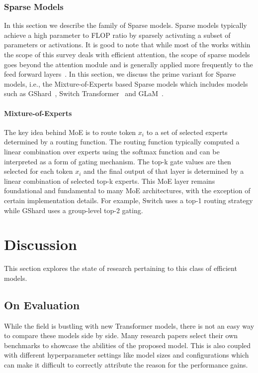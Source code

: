 \subsubsection{Sparse Models} In this section we describe the family of Sparse models. Sparse models typically achieve a high parameter to FLOP ratio by sparsely activating a subset of parameters or activations. It is good to note that while most of the works within the scope of this survey deals with efficient attention, the scope of sparse models goes beyond the attention module and is generally applied more frequently to the feed forward layers~\citep{lepikhin2020gshard,fedus2021switch}. In this section, we discuss the prime variant for Sparse models, i.e., the Mixture-of-Experts based Sparse models which includes models such as GShard~\citep{lepikhin2020gshard}, Switch Transformer~\citep{fedus2021switch} and GLaM~\citep{du2021glam}.
\paragraph{Mixture-of-Experts} The key idea behind MoE is to route token $x_{i}$ to a set of selected experts determined by a routing function. The routing function typically computed a linear combination over experts using the softmax function and can be interpreted as a form of gating mechanism. The top-k gate values are then selected for each token $x_{i}$ and the final output of that layer is determined by a linear combination of selected top-k experts. This MoE layer remains foundational and fundamental to many MoE architectures, with the exception of certain implementation details. For example, Switch uses a top-1 routing strategy while GShard uses a group-level top-2 gating.  

\section{Discussion}
This section explores the state of research pertaining to this class of efficient models. 
\subsection{On Evaluation} While the field is bustling with new Transformer models, there is not an easy way to compare these models side by side. Many research papers select their own benchmarks to showcase the abilities of the proposed model. This is also coupled with different hyperparameter settings like model sizes and configurations which can make it difficult to correctly attribute the reason for the performance gains.

